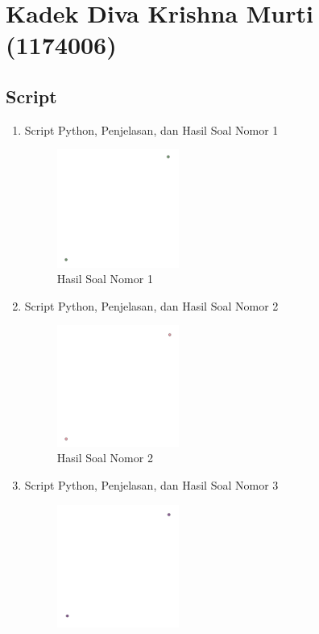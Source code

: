 \section{Kadek Diva Krishna Murti (1174006)}
\subsection{Script}
\begin{enumerate}
	\item Script Python, Penjelasan, dan Hasil Soal Nomor 1
	
	\begin{figure}[H]
		\includegraphics[width=4cm]{figures/1174006/2/1.png}
		\centering
		\caption{Hasil Soal Nomor 1}
	\end{figure}
	\item Script Python, Penjelasan, dan Hasil Soal Nomor 2
	
	\begin{figure}[H]
		\includegraphics[width=4cm]{figures/1174006/2/2.png}
		\centering
		\caption{Hasil Soal Nomor 2}
	\end{figure}
	\item Script Python, Penjelasan, dan Hasil Soal Nomor 3
	
	\begin{figure}[H]
		\includegraphics[width=4cm]{figures/1174006/2/3.png}

\end{figure}
\end{enumerate}
